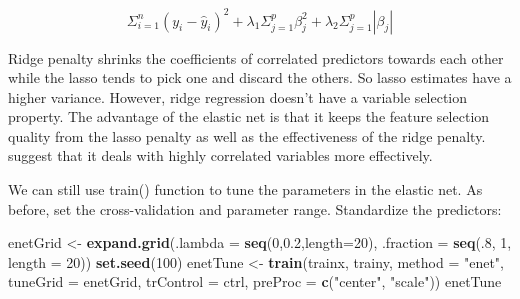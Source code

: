 \documentclass[12pt,]{krantz}
\makeatletter
\newenvironment{Shaded}{\begin{snugshade}}{\end{snugshade}}
\newcommand{\DataTypeTok}[1]{\textcolor[rgb]{0.27,0.27,0.27}{#1}}
\newcommand{\DecValTok}[1]{\textcolor[rgb]{0.06,0.06,0.06}{#1}}
\newcommand{\FloatTok}[1]{\textcolor[rgb]{0.06,0.06,0.06}{#1}}
\newcommand{\KeywordTok}[1]{\textcolor[rgb]{0.27,0.27,0.27}{\textbf{#1}}}
\newcommand{\NormalTok}[1]{#1}
\newcommand{\StringTok}[1]{\textcolor[rgb]{0.5,0.5,0.5}{#1}}
\newenvironment{kframe}{%
\medskip{}
\setlength{\fboxsep}{.8em}
 \def\at@end@of@kframe{}%
 \ifinner\ifhmode%
  \def\at@end@of@kframe{\end{minipage}}%
  \begin{minipage}{\columnwidth}%
 \fi\fi%
 \def\FrameCommand##1{\hskip\@totalleftmargin \hskip-\fboxsep
 \colorbox{shadecolor}{##1}\hskip-\fboxsep
     \hskip-\linewidth \hskip-\@totalleftmargin \hskip\columnwidth}%
 \MakeFramed {\advance\hsize-\width
   \@totalleftmargin\z@ \linewidth\hsize
   \@setminipage}}%
 {\par\unskip\endMakeFramed%
 \at@end@of@kframe}
\renewenvironment{Shaded}{\begin{kframe}}{\end{kframe}}
\makeatother
\begin{document}
\begin{equation}
\Sigma_{i=1}^{n}(y_{i}-\hat{y}_{i})^{2}+\lambda_{1}\Sigma_{j=1}^{p}\beta_{j}^{2}+\lambda_{2}\Sigma_{j=1}^{p}|\beta_{j}|
\label{eq:elasticnet}
\end{equation}

Ridge penalty shrinks the coefficients of correlated predictors towards each other while the lasso tends to pick one and discard the others. So lasso estimates have a higher variance. However, ridge regression doesn't have a variable selection property. The advantage of the elastic net is that it keeps the feature selection quality from the lasso penalty as well as the effectiveness of the ridge penalty. \citep{zou2005} suggest that it deals with highly correlated variables more effectively.

We can still use train() function to tune the parameters in the elastic net. As before, set the cross-validation and parameter range. Standardize the predictors:

\begin{Shaded}
\begin{Highlighting}[]
\NormalTok{enetGrid <-}\StringTok{ }\KeywordTok{expand.grid}\NormalTok{(}\DataTypeTok{.lambda =} \KeywordTok{seq}\NormalTok{(}\DecValTok{0}\NormalTok{,}\FloatTok{0.2}\NormalTok{,}\DataTypeTok{length=}\DecValTok{20}\NormalTok{), }
                        \DataTypeTok{.fraction =} \KeywordTok{seq}\NormalTok{(.}\DecValTok{8}\NormalTok{, }\DecValTok{1}\NormalTok{, }\DataTypeTok{length =} \DecValTok{20}\NormalTok{))}
\KeywordTok{set.seed}\NormalTok{(}\DecValTok{100}\NormalTok{)}
\NormalTok{enetTune <-}\StringTok{ }\KeywordTok{train}\NormalTok{(trainx, trainy,}
                  \DataTypeTok{method =} \StringTok{"enet"}\NormalTok{,}
                  \DataTypeTok{tuneGrid =}\NormalTok{ enetGrid,}
                  \DataTypeTok{trControl =}\NormalTok{ ctrl,}
                  \DataTypeTok{preProc =} \KeywordTok{c}\NormalTok{(}\StringTok{"center"}\NormalTok{, }\StringTok{"scale"}\NormalTok{))}
\NormalTok{enetTune}
\end{Highlighting}
\end{Shaded}
\end{document}
